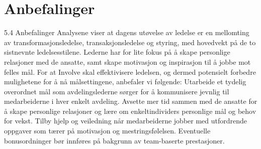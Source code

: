 \section{Anbefalinger}
5.4 Anbefalinger
Analysene viser at dagens utøvelse av ledelse er en mellomting av transformasjonsledelse, transaksjonsledelse og styring, med hovedvekt på de to sistnevnte ledelsesstilene. Lederne har for lite fokus på å skape personlige relasjoner med de ansatte, samt skape motivasjon og inspirasjon til å jobbe mot felles mål. For at Involve skal effektivisere ledelsen, og dermed potensielt forbedre mulighetene for å nå målsettingene, anbefaler vi følgende:
Utarbeide et tydelig overordnet mål som avdelingslederne sørger for å kommunisere jevnlig til medarbeiderne i hver enkelt avdeling.
Avsette mer tid sammen med de ansatte for å skape personlige relasjoner og lære om enkeltindividers personlige mål og behov for vekst.
Tilby hjelp og veiledning når medarbeiderne jobber med utfordrende oppgaver som tærer på motivasjon og mestringsfølelsen.
Eventuelle bonusordninger bør innføres på bakgrunn av team-baserte prestasjoner.
